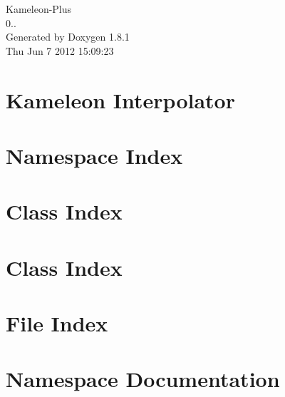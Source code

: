 \documentclass{book}
\begin{document}
\hypersetup{pageanchor=false,citecolor=blue}
\begin{titlepage}
\vspace*{7cm}
\begin{center}
{\Large Kameleon-\/\-Plus \\[1ex]\large 0.. }\\
\vspace*{1cm}
{\large Generated by Doxygen 1.8.1}\\
\vspace*{0.5cm}
{\small Thu Jun 7 2012 15:09:23}\\
\end{center}
\end{titlepage}
\clearemptydoublepage
{}
\tableofcontents
\clearemptydoublepage
{}
\hypersetup{pageanchor=true,citecolor=blue}
\chapter{Kameleon Interpolator}
\label{index}\hypertarget{index}{}
\chapter{Namespace Index}

\chapter{Class Index}

\chapter{Class Index}

\chapter{File Index}

\chapter{Namespace Documentation}







\end{document}
